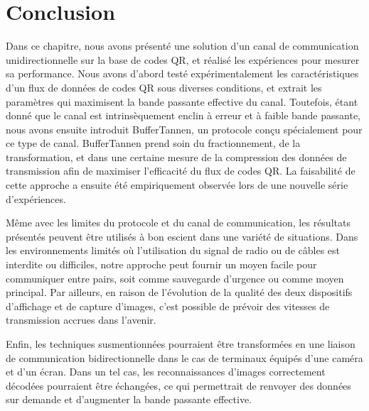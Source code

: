 
\section{Conclusion}\label{sec:qr:conclusion} %

Dans ce chapitre, nous avons présenté une solution d'un canal de communication unidirectionnelle sur la base de codes QR, et réalisé les expériences pour mesurer sa performance. Nous avons d'abord testé expérimentalement les caractéristiques d'un flux de données de codes QR sous diverses conditions, et extrait les paramètres qui  maximisent la bande passante effective du canal. Toutefois, étant donné que le canal est intrinsèquement enclin à erreur et à faible bande passante, nous avons ensuite introduit BufferTannen, un protocole conçu spécialement pour ce type de canal. BufferTannen prend soin du fractionnement, de la transformation, et dans une certaine mesure de la compression des données de transmission afin de maximiser l'efficacité du flux de codes QR. La faisabilité de cette approche a ensuite été empiriquement observée lors de une nouvelle série d'expériences.

Même avec les limites du protocole et du canal de communication, les résultats présentés peuvent être utilisés à bon escient dans une variété de situations. Dans les environnements limités où l'utilisation du signal de radio ou de câbles est interdite ou difficiles, notre approche peut fournir un moyen facile pour communiquer entre pairs, soit comme sauvegarde d'urgence ou comme moyen principal. Par ailleurs, en raison de l'évolution de la qualité des deux dispositifs d'affichage et de capture d'images, c'est possible de prévoir des vitesses de transmission accrues dans l'avenir.

Enfin, les techniques susmentionnées pourraient être transformées en une liaison de communication bidirectionnelle dans le cas de terminaux équipés d'une caméra et d'un écran. Dans un tel cas, les reconnaissances d'images correctement décodées pourraient être échangées, ce qui permettrait de renvoyer des données sur demande et d'augmenter la bande passante effective.

